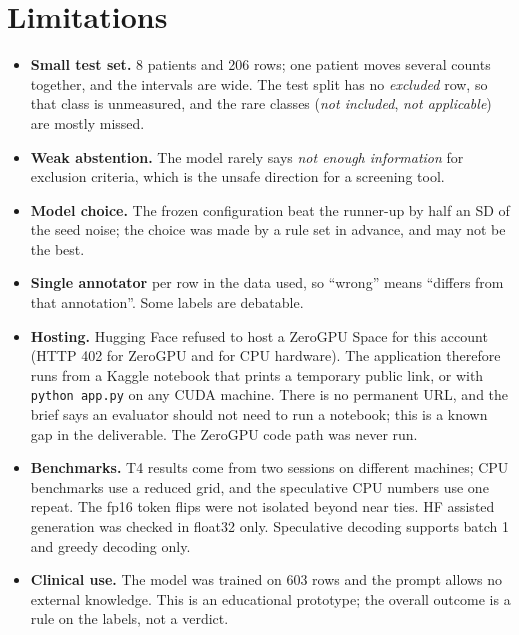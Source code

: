 \documentclass[conference]{IEEEtran}
\begin{document}
\section{Limitations}
\begin{itemize}
\item \textbf{Small test set.} 8 patients and 206 rows; one patient moves several counts together, and the intervals are wide. The test split has no \emph{excluded} row, so that class is unmeasured, and the rare classes (\emph{not included}, \emph{not applicable}) are mostly missed.
\item \textbf{Weak abstention.} The model rarely says \emph{not enough information} for exclusion criteria, which is the unsafe direction for a screening tool.
\item \textbf{Model choice.} The frozen configuration beat the runner-up by half an SD of the seed noise; the choice was made by a rule set in advance, and may not be the best.
\item \textbf{Single annotator} per row in the data used, so ``wrong'' means ``differs from that annotation''. Some labels are debatable.
\item \textbf{Hosting.} Hugging Face refused to host a ZeroGPU Space for this account (HTTP 402 for ZeroGPU and for CPU hardware). The application therefore runs from a Kaggle notebook that prints a temporary public link, or with \texttt{python app.py} on any CUDA machine. There is no permanent URL, and the brief says an evaluator should not need to run a notebook; this is a known gap in the deliverable. The ZeroGPU code path was never run.
\item \textbf{Benchmarks.} T4 results come from two sessions on different machines; CPU benchmarks use a reduced grid, and the speculative CPU numbers use one repeat. The fp16 token flips were not isolated beyond near ties. HF assisted generation was checked in float32 only. Speculative decoding supports batch 1 and greedy decoding only.
\item \textbf{Clinical use.} The model was trained on 603 rows and the prompt allows no external knowledge. This is an educational prototype; the overall outcome is a rule on the labels, not a verdict.
\end{itemize}
\end{document}
